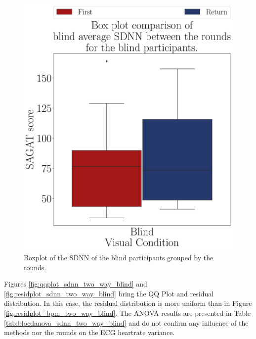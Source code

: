 \begin{figure}[!htb]
\begin{minipage}{0.075\textwidth}
        \hfill
    \end{minipage}
    \begin{minipage}{0.45\textwidth}
        \centering
        \includegraphics[width = \textwidth]{Resultados/ECG/Figuras/pdf/boxplot_ecg_sdnn_blind_rounds.pdf}
        \caption{Boxplot of the SDNN of the blind participants grouped by the rounds.}
        \label{fig:boxplot_ecg_sdnn_blind_rounds}
    \end{minipage}
\end{figure}


Figures \ref{fig:qqplot_sdnn_two_way_blind} and \ref{fig:residplot_sdnn_two_way_blind} bring the QQ Plot and residual distribution. In this case, the residual distribution is more uniform than in Figure \ref{fig:residplot_bpm_two_way_blind}. The ANOVA results are presented in Table \ref{tab:blocdanova_sdnn_two_way_blind} and do not confirm any influence of the methods nor the rounds on the ECG heartrate variance.

